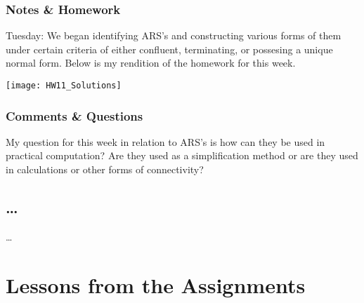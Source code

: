 \documentclass{article}
\theoremstyle{theorem}
\theoremstyle{definition}
\theoremstyle{remark}
\begin{document}
\subsubsection{Notes \& Homework}

Tuesday: We began identifying ARS's and constructing various forms of them under certain criteria of either confluent, terminating, or possesing a unique normal form. Below is my rendition of the homework for this week.

\graphicspath{ {C:/Users/jrmul/OneDrive/Documents/CPSC_Courses/CPSC_354/images/} }
\begin{center} \texttt{[image: HW11\_Solutions]} \end{center}

\subsubsection{Comments \& Questions}

My question for this week in relation to ARS's is how can they be used in practical computation? Are they used as a simplification method or are they used in calculations or other forms of connectivity? 

\subsection{\ldots} 

\ldots

\section{Lessons from the Assignments}




\end{document}
